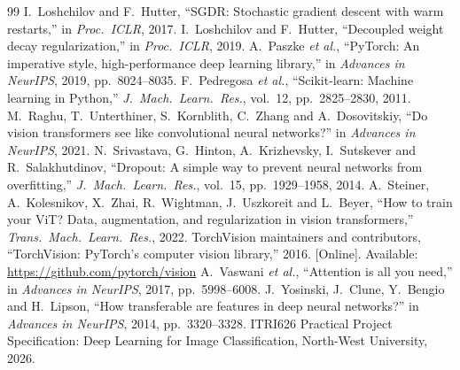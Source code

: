 \documentclass[11pt,a4paper]{article}
\begin{document}
\begin{thebibliography}{99}
 I.~Loshchilov and F.~Hutter, ``SGDR: Stochastic gradient descent with warm restarts,'' in \emph{Proc.\ ICLR}, 2017.
 I.~Loshchilov and F.~Hutter, ``Decoupled weight decay regularization,'' in \emph{Proc.\ ICLR}, 2019.
 A.~Paszke \emph{et al.}, ``PyTorch: An imperative style, high-performance deep learning library,'' in \emph{Advances in NeurIPS}, 2019, pp.~8024--8035.
 F.~Pedregosa \emph{et al.}, ``Scikit-learn: Machine learning in Python,'' \emph{J.\ Mach.\ Learn.\ Res.}, vol.~12, pp.~2825--2830, 2011.
 M.~Raghu, T.~Unterthiner, S.~Kornblith, C.~Zhang and A.~Dosovitskiy, ``Do vision transformers see like convolutional neural networks?'' in \emph{Advances in NeurIPS}, 2021.
 N.~Srivastava, G.~Hinton, A.~Krizhevsky, I.~Sutskever and R.~Salakhutdinov, ``Dropout: A simple way to prevent neural networks from overfitting,'' \emph{J.\ Mach.\ Learn.\ Res.}, vol.~15, pp.~1929--1958, 2014.
 A.~Steiner, A.~Kolesnikov, X.~Zhai, R.~Wightman, J.~Uszkoreit and L.~Beyer, ``How to train your ViT? Data, augmentation, and regularization in vision transformers,'' \emph{Trans.\ Mach.\ Learn.\ Res.}, 2022.
 TorchVision maintainers and contributors, ``TorchVision: PyTorch's computer vision library,'' 2016. [Online]. Available: \url{https://github.com/pytorch/vision}
 A.~Vaswani \emph{et al.}, ``Attention is all you need,'' in \emph{Advances in NeurIPS}, 2017, pp.~5998--6008.
 J.~Yosinski, J.~Clune, Y.~Bengio and H.~Lipson, ``How transferable are features in deep neural networks?'' in \emph{Advances in NeurIPS}, 2014, pp.~3320--3328.
 ITRI626 Practical Project Specification: Deep Learning for Image Classification, North-West University, 2026.
\end{thebibliography}
\end{document}
